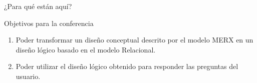 \begin{frame}{¿Para qu\'e est\'an aqu\'i?}
    \begin{block}{Objetivos para la conferencia}
        \begin{enumerate}
            \item Poder transformar un dise\~no conceptual descrito por el modelo MERX en un
            dise\~no l\'ogico basado en el modelo Relacional.
            \item Poder utilizar el dise\~no l\'ogico obtenido para responder las preguntas
            del usuario. 
        \end{enumerate}
        
    \end{block}
\end{frame}